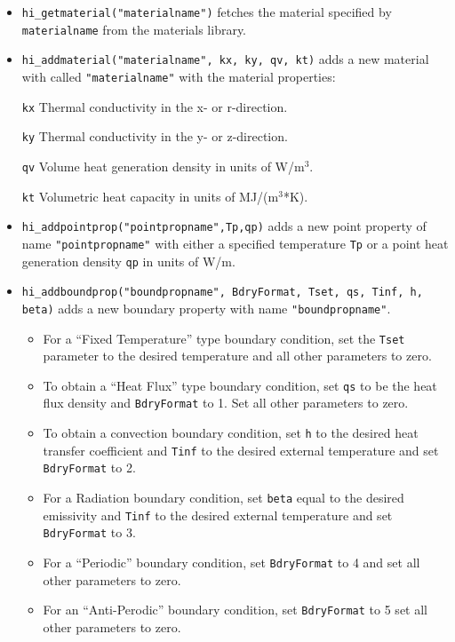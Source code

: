 \begin{itemize}
\item \texttt{hi\_getmaterial("materialname")} fetches the material specified by \texttt{materialname}
from the materials library.

\item \texttt{hi\_addmaterial("materialname", kx, ky, qv, kt)} adds a new material with
called \texttt{"materialname"} with the material properties:

\texttt{kx} Thermal conductivity in the x- or r-direction.

\texttt{ky} Thermal conductivity in the y- or z-direction.

\texttt{qv} Volume heat generation density in units of W/m$^{3}$.

\texttt{kt} Volumetric heat capacity in units of MJ/(m$^{3}$*K).

\item \texttt{hi\_addpointprop("pointpropname",Tp,qp)} adds a new point property of
name \texttt{"pointpropname"} with either a specified temperature
\texttt{Tp} or a point heat generation density \texttt{qp} in units of W/m.

\item \texttt{hi\_addboundprop("boundpropname", BdryFormat, Tset, qs, Tinf, h, beta)}
 adds a new boundary property with name {\tt "boundpropname"}.
\begin{itemize}
\item For a ``Fixed Temperature'' type boundary condition, set the {\tt Tset} parameter to the
desired temperature and all other parameters to zero.
\item To obtain a ``Heat Flux'' type boundary condition, set {\tt qs} to be the heat flux density and
{\tt BdryFormat} to 1. Set all other parameters to zero.
\item To obtain a convection boundary condition, set {\tt h} to the desired heat transfer coefficient and
{\tt Tinf} to the desired external temperature and set {\tt BdryFormat} to 2.
\item For a Radiation boundary condition, set {\tt beta} equal to the desired emissivity and {\tt Tinf} to the
desired external temperature and set {\tt BdryFormat} to 3.
\item For a ``Periodic'' boundary condition, set {\tt BdryFormat} to 4 and set all other
parameters to zero.
\item For an ``Anti-Perodic'' boundary condition, set {\tt BdryFormat} to 5 set all other
parameters to zero.
\end{itemize}


\end{itemize}
